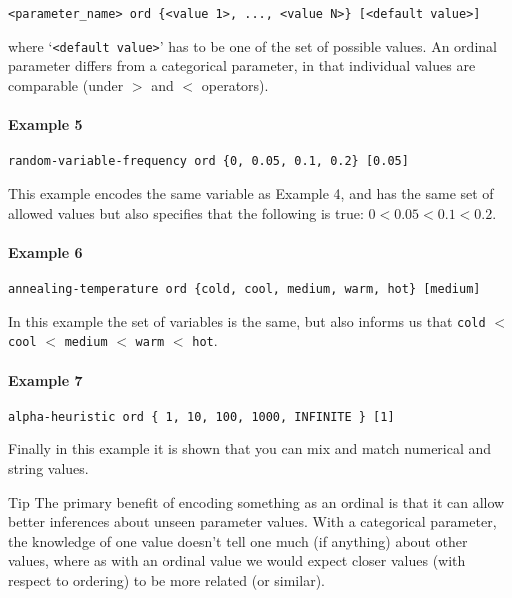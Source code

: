 \documentclass[manual.tex]{subfiles}
\begin{document}
\begin{verbatim}
<parameter_name> ord {<value 1>, ..., <value N>} [<default value>]
\end{verbatim}
where `\texttt{<default value>}' has to be one of the set of possible values. An ordinal parameter differs from a categorical parameter, in that individual values are comparable (under $>$ and $<$ operators). 

\paragraph{Example 5}
\begin{verbatim}
random-variable-frequency ord {0, 0.05, 0.1, 0.2} [0.05]
\end{verbatim}

This example encodes the same variable as Example 4, and has the same set of allowed values but also specifies that the following is true:
$0 < 0.05 < 0.1 < 0.2$. 

\paragraph{Example 6}
\begin{verbatim}
annealing-temperature ord {cold, cool, medium, warm, hot} [medium]
\end{verbatim}

In this example the set of variables is the same, but also informs us that \texttt{cold} $<$ \texttt{cool} $<$ \texttt{medium} $<$ \texttt{warm} $<$ \texttt{hot}.

\paragraph{Example 7}
\begin{verbatim}
alpha-heuristic ord { 1, 10, 100, 1000, INFINITE } [1]
\end{verbatim}

Finally in this example it is shown that you can mix and match numerical and string values. 

\vspace{5pt}
\begin{bclogo}[logo=\bclampe, couleurBarre=red, noborder=true]{Tip}
The primary benefit of encoding something as an ordinal is that it can allow better inferences about unseen parameter values. With a categorical parameter, the knowledge of one value doesn't tell one much (if anything) about other values, where as with an ordinal value we would expect closer values (with respect to ordering) to be more related (or similar).
\end{bclogo}
\end{document}
